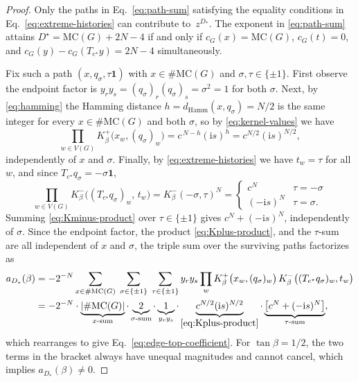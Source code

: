 \documentclass[11pt]{article}
\begin{document}
\begin{proof}
Only the paths in Eq.~\eqref{eq:path-sum} satisfying the equality conditions in
Eq.~\eqref{eq:extreme-histories} can contribute to~$z^{D_*}$. 
The exponent in \eqref{eq:path-sum} attains $D^\star = \mathrm{MC}(G) + 2N-4$
if and only if $c_G(x) = \mathrm{MC}(G)$, $c_G(t) = 0$, and
$c_G(y) -c_G(T_{e^\star} y) = 2N-4$ simultaneously. %

Fix such a path $(x, q_\sigma, \tau\mathbf{1})$ with
$x \in \#\mathrm{MC}(G)$ and $\sigma, \tau \in \{\pm 1\}$. 
First observe the endpoint factor is
$y_r y_s = (q_\sigma)_r (q_\sigma)_s = \sigma^2 = 1$ for both $\sigma$. 
Next, by \eqref{eq:hamming} the Hamming distance
$h = d_{\mathrm{Hamm}}(x, q_\sigma) = N/2$ is the same integer for every
$x \in \#\mathrm{MC}(G)$ and both $\sigma$, so by \eqref{eq:kernel-values} we have
\begin{equation}
\prod_{w \in V(G)} K^{+}_{\beta}\bigl(x_w, (q_\sigma)_w\bigr)
= c^{\,N-h}(\mathrm{i}s)^{h}
= c^{N/2}(\mathrm{i}s)^{N/2},
\label{eq:Kplus-product}
\end{equation}
independently of $x$ and $\sigma$.
Finally, by \eqref{eq:extreme-histories} we have %
$t_w = \tau$ for all $w$, and since $T_{e^\star} q_\sigma = -\sigma\mathbf{1}$,
\begin{equation}
\prod_{w \in V(G)} K^{-}_{\beta}\bigl((T_{e^\star} q_\sigma)_w,\, t_w\bigr)
= K^{-}_{\beta}(-\sigma,\tau)^{N}
=
\begin{cases}
c^{N} & \tau = -\sigma\\[2pt]
(-\mathrm{i}s)^{N} & \tau = \sigma.
\end{cases}
\label{eq:Kminus-product}
\end{equation}
Summing \eqref{eq:Kminus-product} over $\tau \in \{\pm 1\}$ gives
$c^{N} + (-\mathrm{i}s)^{N}$, independently of $\sigma$. 
Since the endpoint factor, the product \eqref{eq:Kplus-product}, and the
$\tau$-sum are all independent of $x$ and $\sigma$, the triple sum over the
surviving paths factorizes as
\begin{align}
a_{D_*}(\beta)
&= -2^{-N} \sum_{x \in \#\mathrm{MC}(G)} \; \sum_{\sigma \in \{\pm 1\}}
   \; \sum_{\tau \in \{\pm 1\}}
   y_r y_s \prod_{w} K^{+}_{\beta}\bigl(x_w,(q_\sigma)_w\bigr)
   \, K^{-}_{\beta}\bigl((T_{e^\star} q_\sigma)_w, t_w\bigr) \notag\\
&= -2^{-N} \cdot \underbrace{|\#\mathrm{MC}(G)|}_{x\text{-sum}}
   \cdot \underbrace{2}_{\sigma\text{-sum}}
   \cdot \underbrace{1}_{y_r y_s}
   \cdot \underbrace{c^{N/2}(\mathrm{i}s)^{N/2}}_{\eqref{eq:Kplus-product}}
   \cdot \underbrace{\bigl[c^{N} + (-\mathrm{i}s)^{N}\bigr]}_{\tau\text{-sum}}
   \notag, %
\label{eq:extreme-coeff-derivation}
\end{align}
which rearranges to give Eq.~\eqref{eq:edge-top-coefficient}. 
For $\tan\beta=1/2$, the two terms in the bracket always have unequal
magnitudes and cannot cancel, which implies $a_{D_*}(\beta)\neq 0.$
\end{proof}
\end{document}
